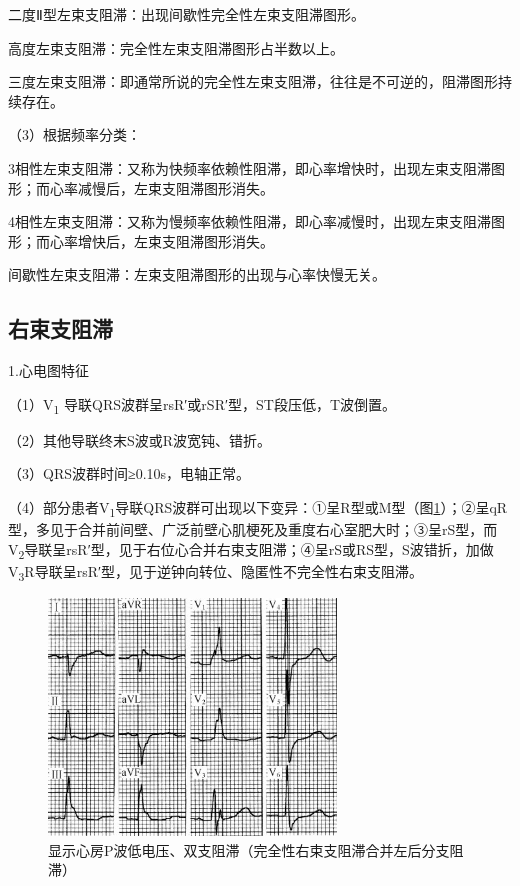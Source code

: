 二度Ⅱ型左束支阻滞：出现间歇性完全性左束支阻滞图形。

高度左束支阻滞：完全性左束支阻滞图形占半数以上。

三度左束支阻滞：即通常所说的完全性左束支阻滞，往往是不可逆的，阻滞图形持续存在。

（3）根据频率分类：

3相性左束支阻滞：又称为快频率依赖性阻滞，即心率增快时，出现左束支阻滞图形；而心率减慢后，左束支阻滞图形消失。

4相性左束支阻滞：又称为慢频率依赖性阻滞，即心率减慢时，出现左束支阻滞图形；而心率增快后，左束支阻滞图形消失。

间歇性左束支阻滞：左束支阻滞图形的出现与心率快慢无关。

\protect\hypertarget{text00028.htmlux5cux23subid345}{}{}

\subsection{右束支阻滞}

1.心电图特征

（1）V\textsubscript{1} 导联QRS波群呈rsR′或rSR′型，ST段压低，T波倒置。

（2）其他导联终末S波或R波宽钝、错折。

（3）QRS波群时间≥0.10s，电轴正常。

（4）部分患者V\textsubscript{1}导联QRS波群可出现以下变异：①呈R型或M型（图\ref{fig21-4}）；②呈qR型，多见于合并前间壁、广泛前壁心肌梗死及重度右心室肥大时；③呈rS型，而V\textsubscript{2}导联呈rsR′型，见于右位心合并右束支阻滞；④呈rS或RS型，S波错折，加做V\textsubscript{3}R导联呈rsR′型，见于逆钟向转位、隐匿性不完全性右束支阻滞。

\begin{figure}[!htbp]
 \centering
 \includegraphics[width=3.01042in,height=2.47917in]{./images/Image00352.jpg}
 \captionsetup{justification=centering}
 \caption{显示心房P波低电压、双支阻滞（完全性右束支阻滞合并左后分支阻滞）}
 \label{fig21-4}
  \end{figure} 

